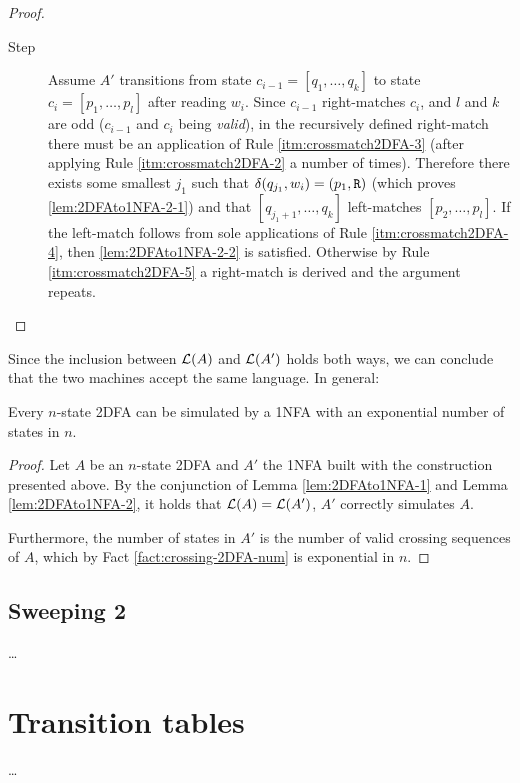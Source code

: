 \begin{proof}
\begin{description}
		\item[Step] Assume $A'$ transitions from state $c_{i-1}=[q_1,\dots,q_k]$ to state $c_i=[p_1,\dots,p_l]$ after reading $w_i$.
		      Since $c_{i-1}$ right-matches $c_i$, and $l$ and $k$ are odd ($c_{i-1}$ and $c_i$ being \emph{valid}), in the recursively defined right-match there must be an application of Rule \ref{itm:crossmatch2DFA-3} (after applying Rule \ref{itm:crossmatch2DFA-2} a number of times).
		      Therefore there exists some smallest $j_1$ such that $\delta(q_{j_1},w_i)=(p_1,\mathtt R)$ (which proves \ref{lem:2DFAto1NFA-2-1}) and that $[q_{j_1+1},\dots,q_k]$ left-matches $[p_2,\dots,p_l]$.
		      If the left-match follows from sole applications of Rule \ref{itm:crossmatch2DFA-4}, then \ref{lem:2DFAto1NFA-2-2} is satisfied.
		      Otherwise by Rule \ref{itm:crossmatch2DFA-5} a right-match is derived and the argument repeats. \qedhere
	\end{description}
\end{proof}

Since the inclusion between $\mathcal L(A)$ and $\mathcal L(A')$ holds both ways, we can conclude that the two machines accept the same language.
In general:
\begin{thrm}\label{thm:2DFAto1NFA}
	Every $n$-state 2DFA can be simulated by a 1NFA with an exponential number of states in $n$.
\end{thrm}
\begin{proof}
	Let $A$ be an $n$-state 2DFA and $A'$ the 1NFA built with the construction presented above.
	By the conjunction of Lemma \ref{lem:2DFAto1NFA-1} and Lemma \ref{lem:2DFAto1NFA-2}, it holds that $\mathcal L(A)=\mathcal L(A')$, \ie $A'$ correctly simulates $A$.

	Furthermore, the number of states in $A'$ is the number of valid crossing sequences of $A$, which by Fact \ref{fact:crossing-2DFA-num} is exponential in $n$.
\end{proof}



\subsection{Sweeping 2\DFAs{}}
\dots


\section{Transition tables}
\dots
